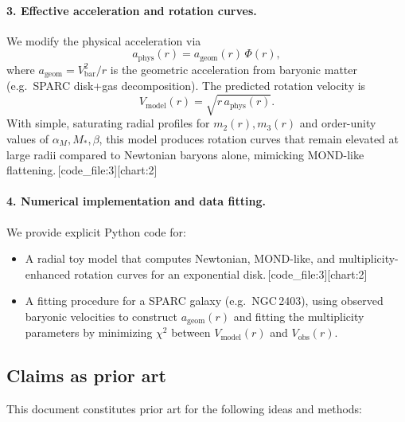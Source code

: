 \documentclass[11pt]{article}
\begin{document}
\paragraph{3. Effective acceleration and rotation curves.}

We modify the physical acceleration via
\[
a_{\mathrm{phys}}(r) = a_{\mathrm{geom}}(r)\,\Phi(r),
\]
where \(a_{\mathrm{geom}} = V_{\mathrm{bar}}^2/r\) is the geometric acceleration from baryonic matter (e.g.\ SPARC disk+gas decomposition). The predicted rotation velocity is
\[
V_{\mathrm{model}}(r) = \sqrt{r\,a_{\mathrm{phys}}(r)}.
\]
With simple, saturating radial profiles for \(m_2(r),m_3(r)\) and order-unity values of \(\alpha_M,M_*,\beta\), this model produces rotation curves that remain elevated at large radii compared to Newtonian baryons alone, mimicking MOND-like flattening.\,[code_file:3][chart:2]

\paragraph{4. Numerical implementation and data fitting.}

We provide explicit Python code for:
\begin{itemize}
  \item A radial toy model that computes Newtonian, MOND-like, and multiplicity-enhanced rotation curves for an exponential disk.\,[code_file:3][chart:2]
  \item A fitting procedure for a SPARC galaxy (e.g.\ NGC\,2403), using observed baryonic velocities to construct \(a_{\mathrm{geom}}(r)\) and fitting the multiplicity parameters by minimizing \(\chi^2\) between \(V_{\mathrm{model}}(r)\) and \(V_{\mathrm{obs}}(r)\).
\end{itemize}

\subsection*{Claims as prior art}

This document constitutes prior art for the following ideas and methods:
\end{document}
